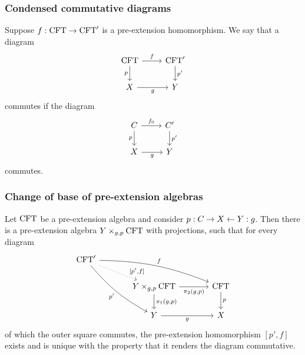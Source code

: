 \documentclass{beamer}
\newcommand\important[1]{\textbf{\color{red!90!black}#1}}
\begin{document}
\begin{frame}
\frametitle{\bf Condensed commutative diagrams}
Suppose $f:\mathrm{CFT}\to\mathrm{CFT}'$ is a pre-extension homomorphism. We say that
a diagram
\begin{equation*}
\begin{tikzcd}[ampersand replacement=\&]
\stesys
  \ar{r}{f}
  \ar{d}[swap]{p}
  \&
\stesys'
  \ar{d}{p'}
  \\
X \ar{r}[swap]{g}
  \&
Y
\end{tikzcd}
\end{equation*}
commutes if the diagram
\begin{equation*}
\begin{tikzcd}[ampersand replacement=\&]
\stesysc
  \ar{r}{f_0}
  \ar{d}[swap]{p}
  \&
\stesysc'
  \ar{d}{p'}
  \\
X \ar{r}[swap]{g}
  \&
Y
\end{tikzcd}
\end{equation*}
commutes.
\end{frame}

\begin{frame}
\frametitle{\bf Change of base of pre-extension algebras}
Let $\mathrm{CFT}$ be a pre-extension algebra and consider $p:C\rightarrow X\leftarrow Y:g$.
Then there is a pre-extension algebra \important{$\cobesys{Y}{\stesys}{g}{p}$} with projections, such that for every diagram
\begin{equation*}
\begin{tikzcd}[ampersand replacement=\&,column sep=large]
\stesys'
  \ar[bend right=10]{ddr}[swap]{p'}
  \ar[bend left=10]{rrd}{f}
  \ar[dotted]{dr}[near end]{[p',f]}
  \\
  {}\&
\cobesys{Y}{\stesys}{g}{p}
  \ar{d}{\pullbackpr{1}{g}{p}}
  \ar{r}[swap]{\pullbackpr{2}{g}{p}}
  \&
\stesys
  \ar{d}{p}
  \\
  {}\&
Y \ar{r}[swap]{g}
  \&
X
\end{tikzcd}
\end{equation*}
of which the outer square commutes, the pre-extension homomorphism \important{$[p',f]$} exists
and is unique with the property that it renders the diagram commutative.
\end{frame}
\end{document}
